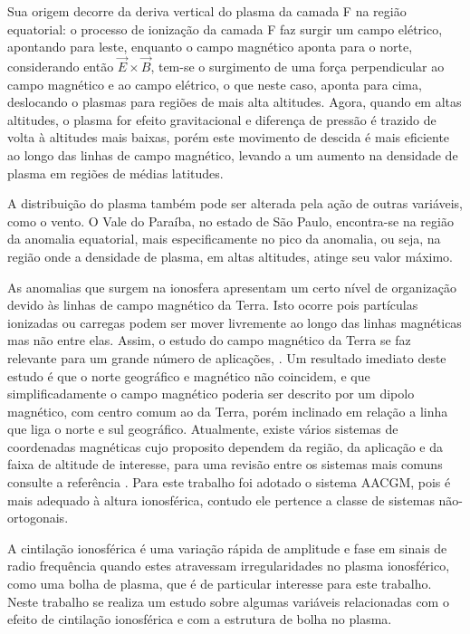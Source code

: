 Sua origem decorre da deriva vertical do plasma da camada F na região equatorial: o processo de ionização da camada F faz surgir um campo elétrico, apontando para leste, enquanto o campo magnético aponta para o norte, considerando então $\vec{E}\times\vec{B}$, tem-se o surgimento de uma força perpendicular ao campo magnético e ao campo elétrico, o que neste caso, aponta para cima, deslocando o plasmas para regiões de mais alta altitudes. Agora, quando em altas altitudes, o plasma for efeito gravitacional e diferença de pressão é trazido de volta à altitudes mais baixas, porém este movimento de descida é mais eficiente ao longo das linhas de campo magnético, levando a um aumento na densidade de plasma em regiões de médias latitudes. 

A distribuição do plasma também pode ser alterada pela ação de outras variáveis, como o vento. O Vale do Paraíba, no estado de São Paulo, encontra-se na região da anomalia equatorial, mais especificamente no pico da anomalia, ou seja, na região onde a densidade de plasma, em altas altitudes, atinge seu valor máximo.

As anomalias que surgem na ionosfera apresentam um certo nível de organização devido às linhas de campo magnético da Terra. Isto ocorre pois partículas ionizadas ou carregas podem ser mover livremente ao longo das linhas magnéticas mas não entre elas. Assim, o estudo do campo magnético da Terra se faz relevante para um grande número de aplicações, \cite{LAUNDAL:2017}. Um resultado imediato deste estudo é que o norte geográfico e magnético não coincidem, e que simplificadamente o campo magnético poderia ser descrito por um dipolo magnético, com centro comum ao da Terra, porém inclinado em relação a linha que liga o norte e sul geográfico. Atualmente, existe vários sistemas de coordenadas magnéticas cujo proposito dependem da região, da aplicação e da faixa de altitude de interesse, para uma revisão entre os sistemas mais comuns consulte a referência \cite{LAUNDAL:2017}. Para este trabalho foi adotado o sistema AACGM, pois é mais adequado à altura ionosférica, contudo ele pertence a classe de sistemas não-ortogonais.

A cintilação ionosférica é uma variação rápida de amplitude e fase em sinais de radio frequência quando estes atravessam irregularidades no plasma ionosférico, como uma bolha de plasma, que é de particular interesse para este trabalho. Neste trabalho se realiza um estudo sobre algumas variáveis relacionadas com o efeito de cintilação ionosférica e com a estrutura de bolha no plasma.

